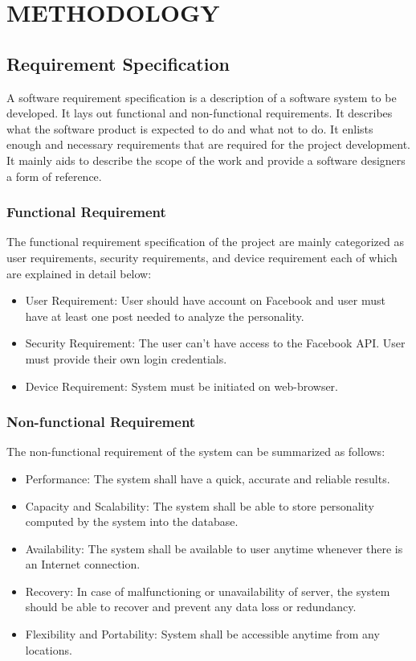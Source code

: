 \newpage
\section{METHODOLOGY}

\subsection{Requirement Specification}
A software requirement specification is a description of a software system to be developed. It lays out functional and non-functional requirements. It describes what the software product is expected to do and what not to do. It enlists enough and necessary requirements that are required for the project development. It mainly aids to describe the scope of the work and provide a software designers a form of reference.
\subsubsection{Functional Requirement}
The functional requirement specification of the project are mainly categorized as user requirements, security requirements, and device requirement each of which are explained in detail below:
\begin{itemize}
\item User Requirement: User should have account on Facebook and user must have at least one post needed to analyze the personality.
\item Security Requirement: The user can't have access to the Facebook API. User must provide their own login credentials.
\item Device Requirement: System must be initiated on web-browser.

\end{itemize}
\subsubsection{Non-functional Requirement}
The non-functional requirement of the system can be summarized as follows:
\begin{itemize}
\item Performance: The system shall have a quick, accurate and reliable results.
\item Capacity and Scalability: The system shall be able to store personality computed by the system into the database.
\item Availability: The system shall be available to user anytime whenever there is an Internet connection.
\item Recovery: In case of malfunctioning or unavailability of server, the system should be able to recover and prevent any data loss or redundancy.
\item Flexibility and Portability: System shall be accessible anytime from any locations. 
\end{itemize}
